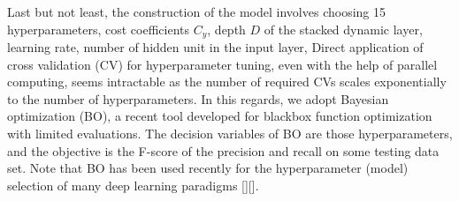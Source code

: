 Last but not least, the construction of the \modelname model involves choosing 15 hyperparameters, \eg cost coefficients $C_{y}$, depth $D$ of the stacked dynamic layer, learning rate, number of hidden unit in the input layer, \etc
Direct application of cross validation (CV) for hyperparameter tuning, even with the help of parallel computing, seems intractable as the number of required CVs scales exponentially to the number of hyperparameters.
In this regards, we adopt Bayesian optimization (BO), a recent tool developed for blackbox function optimization with limited evaluations.
The decision variables of BO are those hyperparameters, and the objective is the F-score of the precision and recall on some testing data set.
Note that BO has been used recently for the hyperparameter (model) selection of many deep learning paradigms [][].




